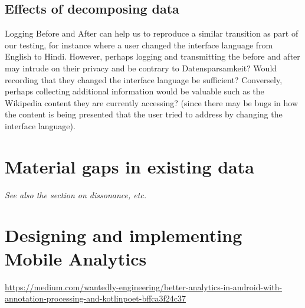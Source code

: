  \subsection{Effects of decomposing data}
 Logging Before and After can help us to reproduce a similar transition as part of our testing, for instance where a user changed the interface language from English to Hindi. However, perhaps logging and transmitting the before and after may intrude on their privacy and be contrary to Datensparsamkeit? Would recording that they changed the interface language be sufficient? Conversely, perhaps collecting additional information would be valuable such as the Wikipedia content they are currently accessing? (since there may be bugs in how the content is being presented that the user tried to address by changing the interface language).
 
 \section{Material gaps in existing data}
 \textit{See also the section on dissonance, etc.}
 
 \section{Designing and implementing Mobile Analytics}
 \url{https://medium.com/wantedly-engineering/better-analytics-in-android-with-annotation-processing-and-kotlinpoet-bffca3f24c37}